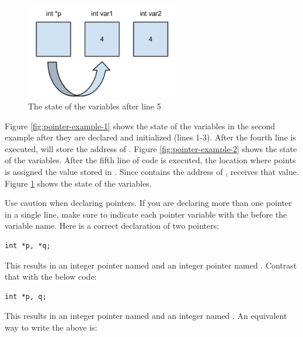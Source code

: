 \begin{figure}[tbh]
  \centering
  \includegraphics[width=0.6\textwidth]{diagrams/pointer-example-3.pdf}
  \caption{The state of the variables after line 5} \label{fig:pointer-example-3} 
\end{figure}

Figure \ref{fig:pointer-example-1} shows the state of the variables in the second example after they are declared and initialized (lines 1-3).
After the fourth line is executed,  will store the address of . Figure \ref{fig:pointer-example-2} shows the state of the variables.
After the fifth line of code is executed, the location where  points is assigned the value stored in .
Since  contains the address of ,  receives that value. Figure \ref{fig:pointer-example-3} shows the state of the variables.

Use caution when declaring pointers.
If you are declaring more than one pointer in a single line, make sure to indicate each pointer variable with the \Code{*} before the variable name.  
Here is a correct declaration of two pointers:

\noindent\begin{minipage}{\linewidth}\begin{lstlisting}
int *p, *q;
\end{lstlisting}\end{minipage}

This results in an integer pointer named  and an integer pointer named . 
Contrast that with the below code:

\noindent\begin{minipage}{\linewidth}\begin{lstlisting}
int *p, q;
\end{lstlisting}\end{minipage}

This results in an integer pointer named  and an integer named . 
An equivalent way to write the above is:

